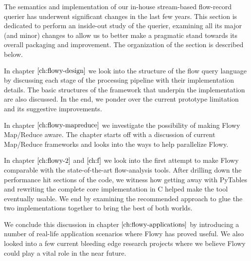 The semantics and implementation of our in-house stream-based flow-record querier has underwent significant changes in the last few years. This section is dedicated to perform an inside-out study of the querier, examining all its major (and minor) changes to allow us to better make a pragmatic stand towards its overall packaging and improvement. The organization of the section is described below.

\vspace{50pt}

In chapter $\ref{ch:flowy-design}$ we look into the structure of the flow query language by discussing each stage of the processing pipeline with their implementation details. The basic structures of the framework that underpin the implementation are also discussed. In the end, we ponder over the current prototype limitation and its suggestive improvements.

In chapter $\ref{ch:flowy-mapreduce}$ we investigate the possibility of making Flowy Map/Reduce aware. The chapter starts off with a discussion of current Map/Reduce frameworks and looks into the ways to help parallelize Flowy.

In chapter $\ref{ch:flowy-2}$ and $\ref{ch:f}$ we look into the first attempt to make Flowy comparable with the state-of-the-art flow-analysis tools. After drilling down the performance hit sections of the code, we witness how getting away with PyTables and rewriting the complete core implementation in C helped make the tool eventually usable. We end by examining the recommended approach to glue the two implementations together to bring the best of both worlds.

We conclude this discussion in chapter $\ref{ch:flowy-applications}$ by introducing a number of real-life application scenarios where Flowy has proved useful. We also looked into a few current bleeding edge research projects where we believe Flowy could play a vital role in the near future.